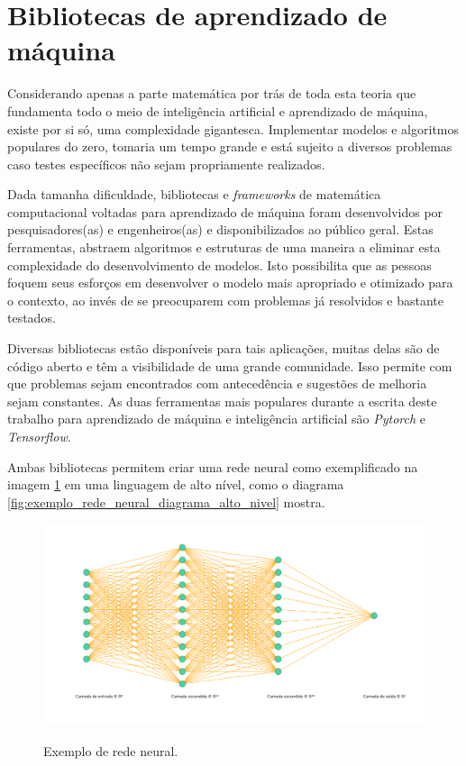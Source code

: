 \section{Bibliotecas de aprendizado de máquina}
\label{bibliotecas}

Considerando apenas a parte matemática por trás de toda esta teoria que fundamenta todo o meio de inteligência artificial e aprendizado de máquina, existe por si só, uma complexidade gigantesca. Implementar modelos e algoritmos populares do zero, tomaria um tempo grande e está sujeito a diversos problemas caso testes específicos não sejam propriamente realizados. 

Dada tamanha dificuldade, bibliotecas e \textit{frameworks} de matemática computacional voltadas para aprendizado de máquina foram desenvolvidos por pesquisadores(as) e engenheiros(as) e disponibilizados ao público geral. Estas ferramentas, abstraem algoritmos e estruturas de uma maneira a eliminar esta complexidade do desenvolvimento de modelos. Isto possibilita que as pessoas foquem seus esforços em desenvolver o modelo mais apropriado e otimizado para o contexto, ao invés de se preocuparem com problemas já resolvidos e bastante testados. 

Diversas bibliotecas estão disponíveis para tais aplicações, muitas delas são de código aberto e têm a visibilidade de uma grande comunidade. Isso permite com que problemas sejam encontrados com antecedência e sugestões de melhoria sejam constantes. As duas ferramentas mais populares durante a escrita deste trabalho para aprendizado de máquina e inteligência artificial são \textit{Pytorch} e \textit{Tensorflow}.

Ambas bibliotecas permitem criar uma rede neural como exemplificado na imagem \ref{fig:exemplo_rede_neural} em uma linguagem de alto nível, como o diagrama \ref{fig:exemplo_rede_neural_diagrama_alto_nivel} mostra.

\begin{figure}[H]
    \centering
    \caption{Exemplo de rede neural.}
    \includegraphics[width=14cm]{fig/nn_8_12_10_1.png}
    \label{fig:exemplo_rede_neural}
\end{figure}

